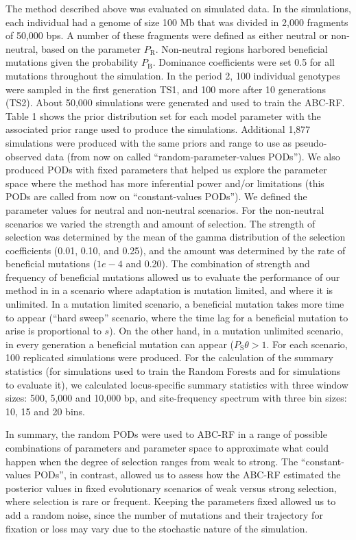 \documentclass[a4paper, 12pt]{article}
\begin{document}
The method described above was evaluated on simulated data. In the simulations, each individual had a genome of size 100 Mb that was divided in 2,000 fragments of 50,000 bps. A number of these fragments were defined as either neutral or non-neutral, based on the parameter $P_{\mathrm{R}}$. Non-neutral regions harbored beneficial mutations given the probability $P_{\mathrm{B}}$. Dominance coefficients were set 0.5 for all mutations throughout the simulation. In the period 2, 100 individual genotypes were sampled in the first generation TS1, and 100 more after 10 generations (TS2). About 50,000 simulations were generated and used to train the ABC-RF. Table 1 shows the prior distribution set for each model parameter with the associated prior range used to produce the simulations. Additional 1,877 simulations were produced with the same priors and range to use as pseudo-observed data (from now on called ``random-parameter-values PODs''). We also produced PODs with fixed parameters that helped us explore the parameter space where the method has more inferential power and/or limitations (this PODs are called from now on ``constant-values PODs''). We defined the parameter values for neutral and non-neutral scenarios. For the non-neutral scenarios we varied the strength and amount of selection. The strength of selection was determined by the mean of the gamma distribution of the selection coefficients (0.01, 0.10, and 0.25), and the amount was determined by the rate of beneficial mutations ($1e-4$ and 0.20). The combination of strength and frequency of beneficial mutations allowed us to evaluate the performance of our method in in a scenario where adaptation is mutation limited, and where it is unlimited. In a mutation limited scenario, a beneficial mutation takes more time to appear (``hard sweep'' scenario, where the time lag for a beneficial mutation to arise is proportional to $s$). On the other hand, in a mutation unlimited scenario, in every generation a beneficial mutation can appear ($P_{\mathrm{S}}\theta > 1$. For each scenario, 100 replicated simulations were produced. For the calculation of the summary statistics (for simulations used to train the Random Forests and for simulations to evaluate it), we calculated locus-specific summary statistics with three window sizes: 500, 5,000 and 10,000 bp, and site-frequency spectrum with three bin sizes: 10, 15 and 20 bins.

In summary, the random PODs were used to ABC-RF in a range of possible combinations of parameters and parameter space to approximate what could happen when the degree of selection ranges from weak to strong. The ``constant-values PODs'', in contrast, allowed us to assess how the ABC-RF estimated the posterior values in fixed evolutionary scenarios of weak versus strong selection, where selection is rare or frequent. Keeping the parameters fixed allowed us to add a random noise, since the number of mutations and their trajectory for fixation or loss may vary due to the stochastic nature of the simulation.
\end{document}
